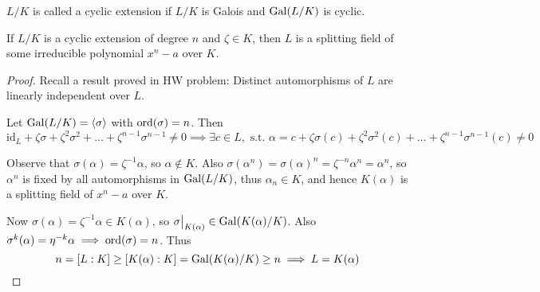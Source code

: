 \begin{definition}
  $L/K$ is called a cyclic extension if $L/K$ is Galois and $\operatorname{Gal}(L/K)$ is cyclic.
\end{definition}

\begin{theorem} \label{thm:kummer-base-theorem}
  If $L/K$ is a cyclic extension of degree $n$ and $\zeta \in K$, then $L$ is a splitting field of
  some irreducible polynomial $x^n - a$ over $K$.

  \begin{proof}
    Recall a result proved in HW problem: Distinct automorphisms of $L$ are linearly independent over $L$.
    
    Let $\operatorname{Gal}(L/K) = \langle \sigma \rangle$ with $\operatorname{ord}(\sigma) = n$. Then
    \[ \text{id}_L + \zeta \sigma + \zeta^2 \sigma^2 + \dots + \zeta^{n-1} \sigma^{n-1} \neq 0
      \implies \exists c \in L, \text{ s.t. } \alpha = c + \zeta \sigma(c) + \zeta^2 \sigma^2(c)
      + \dots + \zeta^{n-1} \sigma^{n-1}(c) \neq 0 \]

    Observe that $\sigma(\alpha) = \zeta^{-1} \alpha$, so $\alpha \not\in K$. Also $\sigma(\alpha^n)
    = \sigma(\alpha)^n = \zeta^{-n}\alpha^n = \alpha^n$, so $\alpha^n$ is fixed by all automorphisms
    in $\operatorname{Gal}(L/K)$, thus $\alpha_n \in K$, and hence $K(\alpha)$ is a splitting field of $x^n - a$ over $K$.

    Now $\sigma(\alpha) = \zeta^{-1}\alpha \in K(\alpha)$, so $\sigma\big|_{K(\alpha)} \in \operatorname{Gal}(K(\alpha) / K)$.
    Also $\sigma^k(\alpha) = \eta^{-k} \alpha \implies \operatorname{ord}(\sigma) = n$.
    Thus
    \[ n = [L: K] \geq [K(\alpha): K] = \operatorname{Gal}(K(\alpha) / K) \geq n \implies L = K(\alpha) \]
  \end{proof}
\end{theorem}

